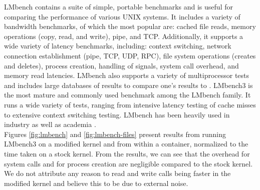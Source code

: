 LMbench contains a suite of simple, portable benchmarks and is useful for comparing the performance of various UNIX systems.  It includes a variety of bandwidth benchmarks, of which the most popular are: cached file reads, memory operations (copy, read, and write), pipe, and TCP.  Additionally, it supports a wide variety of latency benchmarks, including: context switching, network connection establishment (pipe, TCP, UDP, RPC), file system operations (creates and deletes), process creation, handling of signals, system call overhead, and memory read latencies.  LMbench also supports a variety of multiprocessor tests and includes large databases of results to compare one's results to \cite{lmbench_paper}. LMbench3 is the most mature and commonly used benchmark among the LMbench family.  It runs a wide variety of tests, ranging from intensive latency testing of cache misses to extensive context switching testing.  LMbench has been heavily used in industry as well as academia \cite{lmbench}.\\

Figures \ref{fig:lmbench} and \ref{fig:lmbench-files} present results from running LMbench3 on a modified kernel and from within a container, normalized to the time taken on a stock kernel.  From the results, we can see that the overhead for system calls and for process creation are negligible compared to the stock kernel. We do not attribute any reason to read and write calls being faster in the modified kernel and believe this to be due to external noise. 

